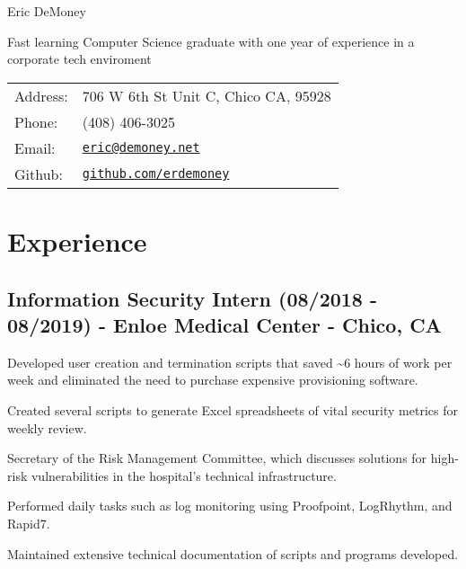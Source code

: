 \documentclass[letterpaper]{article}
\def\name{Eric DeMoney}
\renewenvironment{itemize}{
  \begin{list}{}{
    \setlength{\leftmargin}{1.5em}
  }
}{
  \end{list}
}
\begin{document}
{\huge \name}



\begin{minipage}{0.475\linewidth}
    Fast learning Computer Science graduate with one year of experience in a corporate tech enviroment
\end{minipage}
\hspace{0.125cm}
\begin{minipage}{0.475\linewidth}
  \begin{tabular}{ll}
    Address: & 706 W 6th St Unit C, Chico CA, 95928\\
    Phone: & (408) 406-3025 \\
    Email: & \href{mailto:eric@demoney.net}{\tt eric@demoney.net} \\
    Github: & \href{https://github.com/erdemoney}{\tt github.com/erdemoney} \\
  \end{tabular}
\end{minipage}

\section*{Experience}
\subsection*{Information Security Intern (08/2018 - 08/2019) - Enloe Medical Center - Chico, CA
}
\begin{itemize}
    \item[$\bullet$] Developed user creation and termination scripts that saved \textasciitilde 6 hours of work per week and eliminated the need to purchase expensive provisioning software.
 \item[$\bullet$] Created several scripts to generate Excel spreadsheets of vital security metrics for weekly review.
 \item[$\bullet$] Secretary of the Risk Management Committee, which discusses solutions for high-risk vulnerabilities in the hospital's technical infrastructure.
 \item[$\bullet$] Performed daily tasks such as log monitoring using Proofpoint, LogRhythm, and Rapid7.
 \item[$\bullet$] Maintained extensive technical documentation of scripts and programs developed.
\end{itemize}
\end{document}
